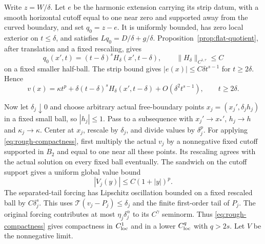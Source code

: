 \documentclass[11pt]{article}
\numberwithin{equation}{section}
\newcommand{\T}{\mathcal T}
\begin{document}
Write $z=W/\delta$. Let $e$ be the harmonic extension carrying its strip
datum, with a smooth horizontal cutoff equal to one near zero and supported
away from the curved boundary, and set $q_0=z-e$. It is uniformly bounded,
has zero local exterior on $t\leq\delta$, and satisfies
$Lq_0=D/\delta+g/\delta$. Proposition~\ref{prop:flat-quotient}, after
translation and a fixed rescaling, gives
\[
 q_0(x',t)=(t-\delta)^s H_\delta(x',t-\delta),\qquad
                    \|H_\delta\|_{C^{1,\tau}}\leq C
\]
on a fixed smaller half-ball. The strip bound gives
$|e(x)|\leq C\delta t^{s-1}$ for $t\geq2\delta$. Hence
\begin{equation}\label{eq:outer-expansion}
 v(x)=\kappa t^p+\delta(t-\delta)^sH_\delta(x',t-\delta)
                           +O(\delta^2t^{s-1}),\qquad t\geq2\delta.
\end{equation}

Now let $\delta_j\downarrow0$ and choose arbitrary actual free-boundary
points $x_j=(x_j',\delta_j h_j)$ in a fixed small ball, so $|h_j|\leq1$.
Pass to a subsequence with $x_j'\to x_*'$, $h_j\to h$ and
$\kappa_j\to\kappa$. Center at $x_j$, rescale by $\delta_j$, and divide
values by $\delta_j^p$. For applying \eqref{eq:rough-compactness}, first
multiply the actual $v_j$ by a nonnegative fixed cutoff supported in $B_2$
and equal to one near all these points. Its rescaling agrees with the actual
solution on every fixed ball eventually. The sandwich on the cutoff support
gives a uniform global value bound
\begin{equation}\label{eq:inner-value-growth}
                    |V_j(y)|\leq C(1+|y|)^p.
\end{equation}
The separated-tail forcing has Lipschitz oscillation bounded on a fixed
rescaled ball by $C\delta_j^s$. This uses
$\T(v_j-P_j)\leq\delta_j$ and the finite first-order tail of $P_j$.
The original forcing contributes at most $\eta_j\delta_j^\alpha$ to its
$C^\gamma$ seminorm. Thus \eqref{eq:rough-compactness} gives compactness
in $C^1_{\rm loc}$ and in a lower $C^q_{\rm loc}$ with $q>2s$.
Let $V$ be the nonnegative limit.
\end{document}
